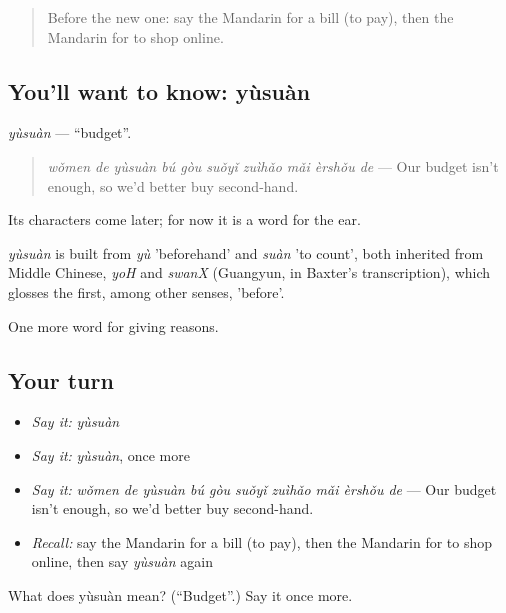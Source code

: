 \label{lesson:ZH-C387-yusuan}



\begin{quote}
Before the new one: say the Mandarin for a bill (to pay), then the Mandarin for to shop online.
\end{quote}

\subsection*{You'll want to know: yùsuàn}
\emph{yùsuàn} — \textquotedblleft{}budget\textquotedblright{}.

\begin{quote}
\emph{wǒmen de yùsuàn bú gòu suǒyǐ zuìhǎo mǎi èrshǒu de} — Our budget isn't enough, so we'd better buy second-hand.
\end{quote}

Its characters come later; for now it is a word for the ear.

\begin{cousinweb}
\emph{yùsuàn} is built from \emph{yù} 'beforehand' and \emph{suàn} 'to count', both inherited from Middle Chinese, \emph{yoH} and \emph{swanX} (Guangyun, in Baxter's transcription), which glosses the first, among other senses, 'before'.
\end{cousinweb}

\begin{grammarlens}[title={What you've built}]
One more word for giving reasons.
\end{grammarlens}

\subsection*{Your turn}
\begin{itemize}
\raggedright
  \item \emph{Say it:} \emph{yùsuàn}
  \item \emph{Say it:} \emph{yùsuàn}, once more
  \item \emph{Say it:} \emph{wǒmen de yùsuàn bú gòu suǒyǐ zuìhǎo mǎi èrshǒu de} — Our budget isn't enough, so we'd better buy second-hand.
  \item \emph{Recall:} say the Mandarin for a bill (to pay), then the Mandarin for to shop online, then say \emph{yùsuàn} again
\end{itemize}

\begin{tcolorbox}[breakable,colback=teal!4,colframe=teal!35!black,title={Before you move on}]
What does yùsuàn mean? (\textquotedblleft{}Budget\textquotedblright{}.) Say it once more.
\end{tcolorbox}
